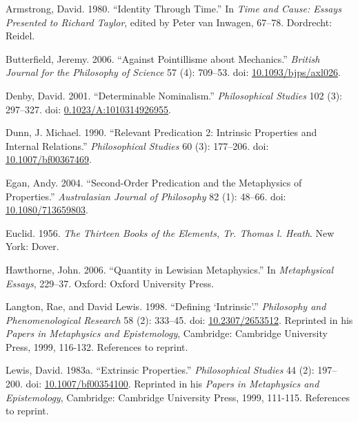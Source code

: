 \documentclass[
  10pt,
  letterpaper,
  DIV=11,
  numbers=noendperiod,
  twoside]{scrartcl}
\newlength{\cslhangindent}
\newenvironment{CSLReferences}[2] %
 {\begin{list}{}{%
  \setlength{\itemindent}{0pt}
  \setlength{\leftmargin}{0pt}
  \setlength{\parsep}{0pt}
  \ifodd #1
   \setlength{\leftmargin}{\cslhangindent}
   \setlength{\itemindent}{-1\cslhangindent}
  \fi
  \setlength{\itemsep}{#2\baselineskip}}}
 {\end{list}}
\begin{document}
\label{refs}
\begin{CSLReferences}{1}{0}
Armstrong, David. 1980. {``Identity Through Time.''} In \emph{Time and
Cause: Essays Presented to Richard Taylor}, edited by Peter van Inwagen,
67--78. Dordrecht: Reidel.

Butterfield, Jeremy. 2006. {``Against Pointillisme about Mechanics.''}
\emph{British Journal for the Philosophy of Science} 57 (4): 709--53.
doi: \href{https://doi.org/10.1093/bjps/axl026}{10.1093/bjps/axl026}.

Denby, David. 2001. {``Determinable Nominalism.''} \emph{Philosophical
Studies} 102 (3): 297--327. doi:
\href{https://doi.org/0.1023/A:1010314926955}{0.1023/A:1010314926955}.

Dunn, J. Michael. 1990. {``Relevant Predication 2: Intrinsic Properties
and Internal Relations.''} \emph{Philosophical Studies} 60 (3):
177--206. doi:
\href{https://doi.org/10.1007/bf00367469}{10.1007/bf00367469}.

Egan, Andy. 2004. {``Second-Order Predication and the Metaphysics of
Properties.''} \emph{Australasian Journal of Philosophy} 82 (1): 48--66.
doi: \href{https://doi.org/10.1080/713659803}{10.1080/713659803}.

Euclid. 1956. \emph{The Thirteen Books of the Elements, {Tr. Thomas l.
Heath}}. New York: Dover.

Hawthorne, John. 2006. {``Quantity in Lewisian Metaphysics.''} In
\emph{Metaphysical Essays}, 229--37. Oxford: Oxford University Press.

Langton, Rae, and David Lewis. 1998. {``Defining {`Intrinsic'}.''}
\emph{Philosophy and Phenomenological Research} 58 (2): 333--45. doi:
\href{https://doi.org/10.2307/2653512}{10.2307/2653512}. Reprinted in
his \emph{Papers in Metaphysics and Epistemology}, Cambridge: Cambridge
University Press, 1999, 116-132. References to reprint.

Lewis, David. 1983a. {``Extrinsic Properties.''} \emph{Philosophical
Studies} 44 (2): 197--200. doi:
\href{https://doi.org/10.1007/bf00354100}{10.1007/bf00354100}. Reprinted
in his \emph{Papers in Metaphysics and Epistemology}, Cambridge:
Cambridge University Press, 1999, 111-115. References to reprint.


\end{CSLReferences}
\end{document}
